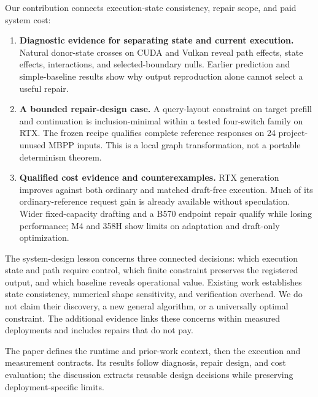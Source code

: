 Our contribution connects execution-state consistency, repair scope, and paid system cost:
\begin{enumerate}
\item \textbf{Diagnostic evidence for separating state and current execution.} Natural donor-state crosses on CUDA and Vulkan reveal path effects, state effects, interactions, and selected-boundary nulls. Earlier prediction and simple-baseline results show why output reproduction alone cannot select a useful repair.
\item \textbf{A bounded repair-design case.} A query-layout constraint on target prefill and continuation is inclusion-minimal within a tested four-switch family on RTX. The frozen recipe qualifies complete reference responses on 24 project-unused MBPP inputs. This is a local graph transformation, not a portable determinism theorem.
\item \textbf{Qualified cost evidence and counterexamples.} RTX generation improves against both ordinary and matched draft-free execution. Much of its ordinary-reference request gain is already available without speculation. Wider fixed-capacity drafting and a B570 endpoint repair qualify while losing performance; M4 and 358H show limits on adaptation and draft-only optimization.
\end{enumerate}

The system-design lesson concerns three connected decisions: which execution state and path require control, which finite constraint preserves the registered output, and which baseline reveals operational value. Existing work establishes state consistency, numerical shape sensitivity, and verification overhead. We do not claim their discovery, a new general algorithm, or a universally optimal constraint. The additional evidence links these concerns within measured deployments and includes repairs that do not pay.

The paper defines the runtime and prior-work context, then the execution and measurement contracts. Its results follow diagnosis, repair design, and cost evaluation; the discussion extracts reusable design decisions while preserving deployment-specific limits.

